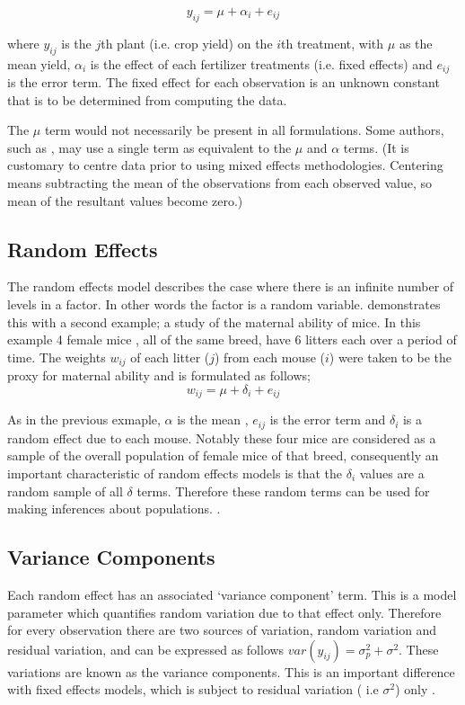 \documentclass[12pt, a4paper]{report}
\theoremstyle{plain}
\theoremstyle{definition}
\theoremstyle{remark}
\begin{document}
\begin{equation}
y_{ij} = \mu + \alpha_{i} + e_{ij}
\end{equation}

where $y_{ij}$ is the $j$th plant (i.e. crop yield) on the $i$th
treatment, with $\mu$ as the mean yield, $\alpha_{i}$ is the
effect of each fertilizer treatments (i.e. fixed effects) and
$e_{ij}$ is the error term. The fixed effect for each observation
is an unknown constant that is to be determined from computing the
data.

The $\mu$ term would not
necessarily be present in all formulations. Some authors, such as
\citet{Demi}, may use a single term as equivalent to the $\mu$ and
$\alpha$ terms. (It is customary to centre data prior to using
mixed effects methodologies. Centering means subtracting the mean
of the observations from each observed value, so mean of the
resultant values become zero.)

\subsection{Random Effects}
The random effects model describes the case where there is an
infinite number of levels in a factor. In other words the factor
is a random variable. \citet{Searle} demonstrates this with a
second example; a study of the maternal ability of mice. In this
example 4 female mice , all of the same breed, have 6 litters each
over a period of time. The weights $w_{ij}$ of each litter ($j$)
from each mouse ($i$) were taken to be the proxy for maternal
ability and is formulated as follows;
\begin{equation}
w_{ij} = \mu + \delta_{i} + e_{ij}
\end{equation}

As in the previous exmaple, $\alpha$ is the mean , $e_{ij}$ is the
error term and $\delta_{i}$ is a random effect due to each mouse.
Notably these four mice are considered as a sample of the overall
population of female mice of that breed, consequently an important
characteristic of random effects models is that the $\delta_{i}$
values are a random sample of all $\delta$ terms. Therefore these
random terms can be used for making inferences about populations.
\citep{McCullSearle}.

\subsection{Variance Components}
Each random effect has an associated `variance component' term.
This is a model parameter which quantifies random variation due to
that effect only. Therefore for every observation there are two
sources of variation, random variation and residual variation, and
can be expressed as follows $var(y_{ij})=\sigma^{2}_{p} +
\sigma^{2}$. These variations are known as the variance
components. This is an important difference with fixed effects
models, which is subject to residual variation ( i.e $\sigma^{2}$)
only \citep{BrownPrescott}.
\end{document}
